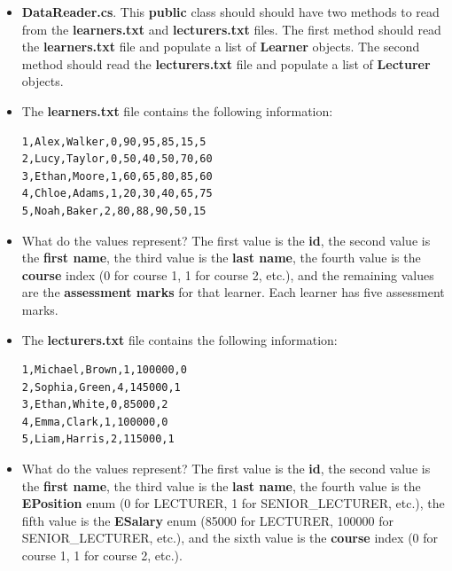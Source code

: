 \documentclass{article}
\begin{document}
\begin{itemize}
    \item \textbf{DataReader.cs}. This \textbf{public} class should should have two methods to read from the \textbf{learners.txt} and \textbf{lecturers.txt} files. The first method should read the \textbf{learners.txt} file and populate a list of \textbf{Learner} objects. The second method should read the \textbf{lecturers.txt} file and populate a list of \textbf{Lecturer} objects.
    \item The \textbf{learners.txt} file contains the following information:
            \begin{verbatim}
1,Alex,Walker,0,90,95,85,15,5  
2,Lucy,Taylor,0,50,40,50,70,60  
3,Ethan,Moore,1,60,65,80,85,60  
4,Chloe,Adams,1,20,30,40,65,75  
5,Noah,Baker,2,80,88,90,50,15  
            \end{verbatim}
            \item What do the values represent? The first value is the \textbf{id}, the second value is the \textbf{first name}, the third value is the \textbf{last name}, the fourth value is the \textbf{course} index (0 for course 1, 1 for course 2, etc.), and the remaining values are the \textbf{assessment marks} for that learner. Each learner has five assessment marks.
            \item The \textbf{lecturers.txt} file contains the following information:
        \begin{verbatim}
1,Michael,Brown,1,100000,0
2,Sophia,Green,4,145000,1
3,Ethan,White,0,85000,2
4,Emma,Clark,1,100000,0
5,Liam,Harris,2,115000,1
        \end{verbatim}
        \item What do the values represent? The first value is the \textbf{id}, the second value is the \textbf{first name}, the third value is the \textbf{last name}, the fourth value is the \textbf{EPosition} enum (0 for LECTURER, 1 for SENIOR\_LECTURER, etc.), the fifth value is the \textbf{ESalary} enum (85000 for LECTURER, 100000 for SENIOR\_LECTURER, etc.), and the sixth value is the \textbf{course} index (0 for course 1, 1 for course 2, etc.).

\end{itemize}
\end{document}
